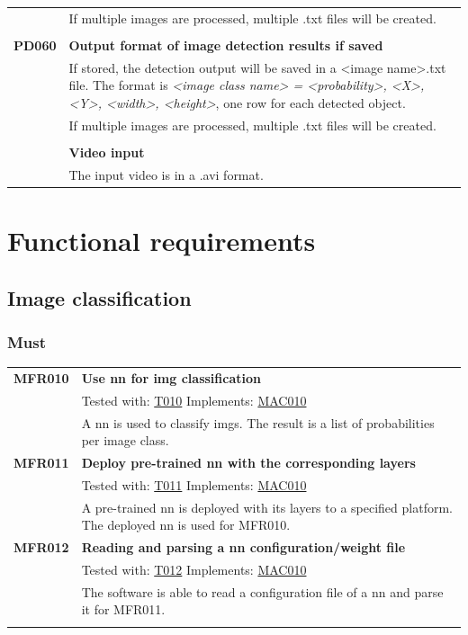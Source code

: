 \documentclass[parskip=full]{scrartcl}
\begin{document}
\begin{tabular}{p{2cm}p{11.4cm}}
& If multiple images are processed, multiple .txt files will be created.\\
& \\
\textbf{PD060}\hypertarget{PD060} & \textbf{Output format of image detection results if saved}\\
& If stored, the detection output will be saved in a <image name>.txt file. The format is \textit{<image class name> = <probability>, <X>, <Y>, <width>, <height>}, one row for each detected object.\\
& If multiple images are processed, multiple .txt files will be created.\\
& \\
\textbf{PD070\hypertarget{PD070}} & \textbf{Video input}\\
& The input video is in a .avi format.
\end{tabular}
\newpage
\section{Functional requirements}
\subsection{Image classification}
\subsubsection{Must}
\begin{tabular}{p{2cm}p{11.4cm}}
\textbf{MFR010}\hypertarget{MFR010} & \textbf{Use \gls{nn} for \gls{img} classification}\\
& Tested with: \hyperlink{T010}{T010} Implements: \hyperlink{MAC010}{MAC010}  \\                                    
& A \gls{nn} is used to classify \glspl{img}. The result is a list of probabilities per image class.\\
\textbf{MFR011}\hypertarget{MFR011} & \textbf{Deploy pre-trained \gls{nn} with the corresponding layers}\\
& Tested with: \hyperlink{T011}{T011} Implements: \hyperlink{MAC010}{MAC010} \\
& A pre-trained \gls{nn} is deployed with its layers to a specified platform. The deployed \gls{nn} is used for MFR010.\\
\textbf{MFR012} \hypertarget{MFR012}& \textbf{Reading and parsing a \gls{nn} configuration/weight file}\\
& Tested with: \hyperlink{T012}{T012} Implements: \hyperlink{MAC010}{MAC010} \\
& The software is able to read a configuration file of a \gls{nn} and parse it for MFR011.\\
& \\
\end{tabular}
\end{document}
